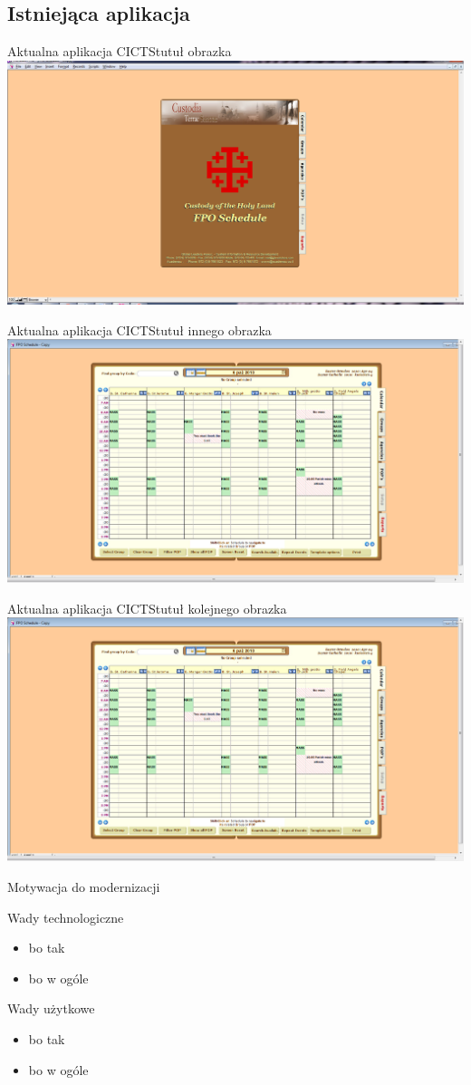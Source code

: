 \subsection{Istniejąca aplikacja}

\begin{frame}{Aktualna aplikacja CICTS}{tutuł obrazka}
   \includegraphics[width=.6\linewidth]{FPOSchedule1.jpg}
\end{frame}

\begin{frame}{Aktualna aplikacja CICTS}{tutuł innego obrazka}
   \includegraphics[width=.6\linewidth]{FPOSchedule2.jpg}
\end{frame}

\begin{frame}{Aktualna aplikacja CICTS}{tutuł kolejnego obrazka}
   \includegraphics[width=.6\linewidth]{FPOSchedule2.jpg}
\end{frame}

\begin{frame}{Motywacja do modernizacji}
    \begin{block}{Wady technologiczne}
        \begin{itemize}
        \item bo tak
        \item bo w ogóle
        \end{itemize}
    \end{block}

    \begin{block}{Wady użytkowe}
        \begin{itemize}
        \item bo tak
        \item bo w ogóle
        \end{itemize}
    \end{block}
\end{frame}

